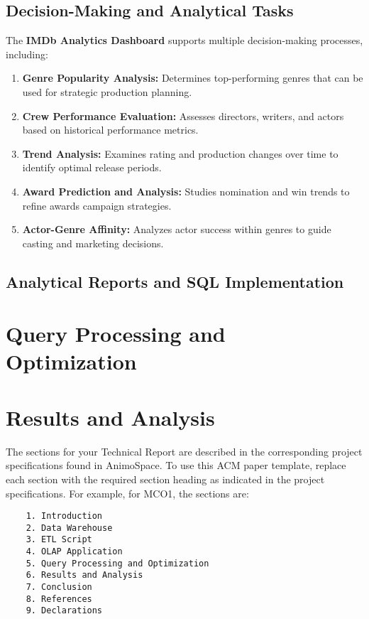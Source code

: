 \documentclass[sigconf, pbalance]{acmart}
\begin{document}
\subsection{Decision-Making and Analytical Tasks}

The \textbf{IMDb Analytics Dashboard} supports multiple decision-making processes, including:

\begin{enumerate}
    \item \textbf{Genre Popularity Analysis:} Determines top-performing genres that can be used for strategic production planning.
    \item \textbf{Crew Performance Evaluation:} Assesses directors, writers, and actors based on historical performance metrics.
    \item \textbf{Trend Analysis:} Examines rating and production changes over time to identify optimal release periods.
    \item \textbf{Award Prediction and Analysis:} Studies nomination and win trends to refine awards campaign strategies.
    \item \textbf{Actor-Genre Affinity:} Analyzes actor success within genres to guide casting and marketing decisions.
\end{enumerate}


\subsection{Analytical Reports and SQL Implementation}

\section{Query Processing and Optimization}

\section{Results and Analysis}

The sections for your Technical Report are described in the corresponding project specifications found in AnimoSpace. 
To use this ACM paper template, replace each section with the required section heading as indicated in the project specifications. For example, for MCO1, the sections are:
\begin{verbatim}
    1. Introduction
    2. Data Warehouse
    3. ETL Script
    4. OLAP Application
    5. Query Processing and Optimization
    6. Results and Analysis
    7. Conclusion
    8. References
    9. Declarations
\end{verbatim}
\end{document}
